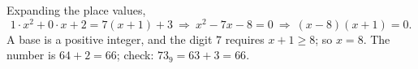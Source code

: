 Expanding the place values,
\[
1\cdot x^2+0\cdot x+2=7(x+1)+3\ \Longrightarrow\ x^2-7x-8=0\ \Longrightarrow\ (x-8)(x+1)=0 .
\]
A base is a positive integer, and the digit $7$ requires $x+1\ge8$; so $x=\boxed{8}$. The number is $64+2=\boxed{66}$; check: $73_9=63+3=66$.
